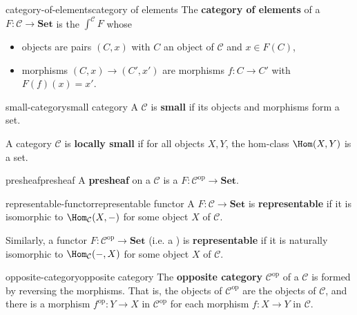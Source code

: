 \begin{topic}{category-of-elements}{category of elements}
    The \textbf{category of elements} of a  $F : \mathcal{C} \to \textbf{Set}$ is the  $\int^{\mathcal{C}} F$ whose
    \begin{itemize}
        \item objects are pairs $(C, x)$ with $C$ an object of $\mathcal{C}$ and $x \in F(C)$,
        \item morphisms $(C, x) \to (C', x')$ are morphisms $f : C \to C'$ with $F(f)(x) = x'$.
    \end{itemize}
\end{topic}

\begin{topic}{small-category}{small category}
    A  $\mathcal{C}$ is \textbf{small} if its objects and morphisms form a set.
    
    A category $\mathcal{C}$ is \textbf{locally small} if for all objects $X, Y$, the hom-class $\Hom(X, Y)$ is a set.
\end{topic}

\begin{topic}{presheaf}{presheaf}
    A \textbf{presheaf} on a  $\mathcal{C}$ is a  $F : \mathcal{C}^\text{op} \to \textbf{Set}$.
\end{topic}

\begin{topic}{representable-functor}{representable functor}
    A  $F : \mathcal{C} \to \textbf{Set}$ is \textbf{representable} if it is  isomorphic to $\Hom_\mathcal{C}(X, -)$ for some object $X$ of $\mathcal{C}$.
    
    Similarly, a functor $F : \mathcal{C}^\text{op} \to \textbf{Set}$ (i.e. a ) is \textbf{representable} if it is naturally isomorphic to $\Hom_\mathcal{C}(-, X)$ for some object $X$ of $\mathcal{C}$.
\end{topic}

\begin{topic}{opposite-category}{opposite category}
    The \textbf{opposite category} $\mathcal{C}^\text{op}$ of a  $\mathcal{C}$ is formed by reversing the morphisms. That is, the objects of $\mathcal{C}^\text{op}$ are the objects of $\mathcal{C}$, and there is a morphism $f^\text{op} : Y \to X$ in $\mathcal{C}^\text{op}$ for each morphism $f : X \to Y$ in $\mathcal{C}$.
\end{topic}

